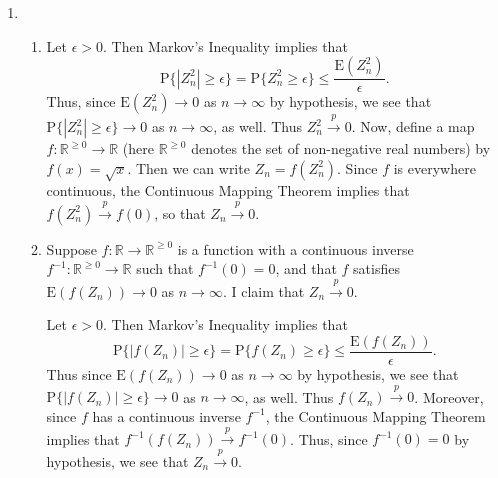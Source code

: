 \documentclass[12pt]{article}
\newcommand{\E}{\mathrm{E}}
\newcommand{\Prob}{\mathrm{P}}
\begin{document}
\begin{enumerate}
\item
\begin{enumerate}[label=(\roman*)]
\item
Let $\epsilon > 0$. Then Markov's Inequality implies that
\begin{equation*}
\Prob\{|Z_n^2| \geq \epsilon\} = \Prob\{Z_n^2 \geq \epsilon\} \leq \frac{\E(Z_n^2)}{\epsilon}.
\end{equation*}
Thus, since $\E(Z_n^2) \to 0$ as $n \to \infty$ by hypothesis, we see that $\Prob\{|Z_n^2| \geq \epsilon\} \to 0$ as $n \to \infty$, as well. Thus $Z_n^2 \overset{p}\to 0$. Now, define a map $f : \mathbb{R}^{\geq 0} \to \mathbb{R}$ (here $\mathbb{R}^{\geq 0}$ denotes the set of non-negative real numbers) by $f(x) = \sqrt{x}$. Then we can write $Z_n = f(Z_n^2)$. Since $f$ is everywhere continuous, the Continuous Mapping Theorem implies that $f(Z_n^2) \overset{p}\to f(0)$, so that $Z_n \overset{p}\to 0$.

\item
Suppose $f : \mathbb{R} \to \mathbb{R}^{\geq 0}$ is a function with a continuous inverse $f^{-1} : \mathbb{R}^{\geq 0} \to \mathbb{R}$ such that $f^{-1}(0) = 0$, and that $f$ satisfies $\E(f(Z_n)) \to 0$ as $n \to \infty$. I claim that $Z_n \overset{p}\to 0$.

Let $\epsilon > 0$. Then Markov's Inequality implies that
\begin{equation*}
\Prob\{|f(Z_n)| \geq \epsilon\} = \Prob\{f(Z_n) \geq \epsilon\} \leq \frac{\E(f(Z_n))}{\epsilon}.
\end{equation*}
Thus since $\E(f(Z_n)) \to 0$ as $n \to \infty$ by hypothesis, we see that $\Prob\{|f(Z_n)| \geq \epsilon\} \to 0$ as $n \to \infty$, as well. Thus $f(Z_n) \overset{p}\to 0$. Moreover, since $f$ has a continuous inverse $f^{-1}$, the Continuous Mapping Theorem implies that $f^{-1}(f(Z_n)) \overset{p}\to f^{-1}(0)$. Thus, since $f^{-1}(0) = 0$ by hypothesis, we see that $Z_n \overset{p}\to 0$.

\end{enumerate}


\end{enumerate}
\end{document}
